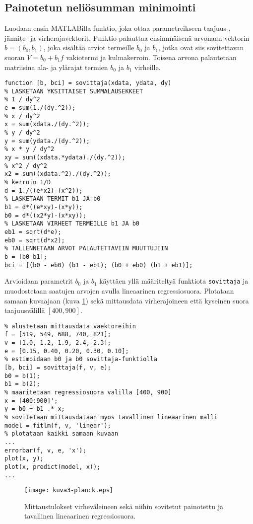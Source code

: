\documentclass[a4paper,11pt]{article}
\begin{document}
{\subsection{Painotetun neliösumman minimointi}

Luodaan ensin MATLABilla funktio, joka ottaa parametreikseen taajuus-,\\ jännite- ja virherajavektorit. Funktio palauttaa ensimmäisenä arvonaan vektorin $b = (b_0, b_1)$, joka sisältää arviot termeille $b_0$ ja $b_1$, jotka ovat siis sovitettavan suoran $V = b_0 + b_1f$ vakiotermi ja kulmakerroin. Toisena arvona palautetaan matriisina ala- ja ylärajat termien $b_0$ ja $b_1$ virheille.

\begin{lstlisting}
function [b, bci] = sovittaja(xdata, ydata, dy)
% LASKETAAN YKSITTAISET SUMMALAUSEKKEET
% 1 / dy^2
e = sum(1./(dy.^2));
% x / dy^2
x = sum(xdata./(dy.^2));
% y / dy^2
y = sum(ydata./(dy.^2));
% x * y / dy^2
xy = sum((xdata.*ydata)./(dy.^2));
% x^2 / dy^2
x2 = sum((xdata.^2)./(dy.^2));
% kerroin 1/D
d = 1./((e*x2)-(x^2));
% LASKETAAN TERMIT b1 JA b0
b1 = d*((e*xy)-(x*y));
b0 = d*((x2*y)-(x*xy));
% LASKETAAN VIRHEET TERMEILLE b1 JA b0
eb1 = sqrt(d*e);
eb0 = sqrt(d*x2);
% TALLENNETAAN ARVOT PALAUTETTAVIIN MUUTTUJIIN
b = [b0 b1];
bci = [(b0 - eb0) (b1 - eb1); (b0 + eb0) (b1 + eb1)];
\end{lstlisting}

Arvioidaan parametrit $b_0$ ja $b_1$ käyttäen yllä määriteltyä funktiota \texttt{sovittaja} ja muodostetaan saatujen arvojen avulla lineaarinen regressiosuora. Plotataan samaan kuvaajaan (kuva \ref{fig:k3}) sekä mittausdata virherajoineen että kyseinen suora taajuusvälillä $[400, 900]$.

\begin{lstlisting}
% alustetaan mittausdata vaektoreihin
f = [519, 549, 688, 740, 821];
v = [1.0, 1.2, 1.9, 2.4, 2.3];
e = [0.15, 0.40, 0.20, 0.30, 0.10];
% estimoidaan b0 ja b0 sovittaja-funktiolla
[b, bci] = sovittaja(f, v, e);
b0 = b(1);
b1 = b(2);
% maaritetaan regressiosuora valilla [400, 900]
x = [400:900]';
y = b0 + b1 .* x;
% sovitetaan mittausdataan myos tavallinen lineaarinen malli
model = fitlm(f, v, 'linear');
% plotataan kaikki samaan kuvaan
...
errorbar(f, v, e, 'x');
plot(x, y);
plot(x, predict(model, x));
...
\end{lstlisting}

\begin{figure}
    \centering
    \texttt{[image: kuva3-planck.eps]}
    \caption{Mittaustulokset virheväleineen sekä niihin sovitetut painotettu ja tavallinen lineaarinen regressiosuora.}
    \label{fig:k3}
\end{figure}

}
\end{document}
